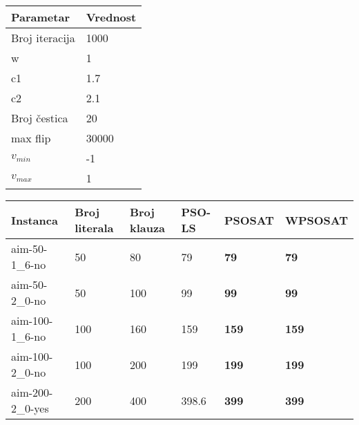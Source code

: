 \documentclass{article}
\begin{document}
\begin{table}[h!]
\centering
{}\label{tab:parametri} 
\begin{tabular}{ |p{3cm}|p{2cm}| }
 \hline
 Parametar 	& Vrednost\\
 \hline
 Broj iteracija & 1000 \\
 \hline
 w 				& 1\\
 \hline
 c1 			& 1.7\\
 \hline
 c2				& 2.1\\ 
 \hline
 Broj čestica	& 20\\
 \hline
 max flip & 30000 \\
 \hline
 $v_{min}$ 		& -1\\
 \hline
 $v_{max}$		& 1\\ 
 \hline
\end{tabular}
\end{table}


\begin{table}[h!]
\centering
{}\label{tab:UNSAT}
\begin{tabular}{ |p{3cm}|p{2cm}|p{2cm}||p{2cm}|p{2cm}|p{2cm}| }
 \hline
 Instanca & Broj literala & Broj klauza & PSO-LS & PSOSAT & WPSOSAT\\
 \hline
 aim-50-1\_6-no & 50 & 80 & 79 & \textbf{79} & \textbf{79}\\
 \hline
 aim-50-2\_0-no & 50 & 100 & 99 & \textbf{99} & \textbf{99}\\
 \hline
 aim-100-1\_6-no & 100 & 160 & 159 & \textbf{159} & \textbf{159}\\
 \hline
 aim-100-2\_0-no & 100 & 200 & 199 & \textbf{199} & \textbf{199}\\
 \hline
 aim-200-2\_0-yes & 200 & 400 & 398.6 & \textbf{399} & \textbf{399}\\
 \hline
\end{tabular}
\end{table}
\end{document}
